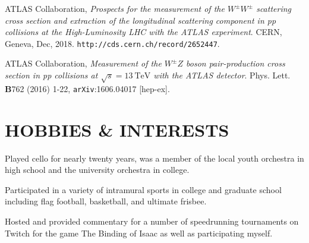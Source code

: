 \documentclass{res}
\begin{document}
\begin{resume}
    ATLAS Collaboration, {\it Prospects for the measurement of the $W^{\pm}W^{\pm}$ scattering cross section and extraction of the longitudinal scattering component in pp collisions at the High-Luminosity LHC with the ATLAS experiment}. CERN, Geneva, Dec, 2018. {\tt http://cds.cern.ch/record/2652447}. %

    ATLAS Collaboration, {\it Measurement of the $W^{\pm}Z$ boson pair-production cross section in pp collisions at $\sqrt{s}=13~\textrm{TeV}$ with the ATLAS detector}. Phys. Lett. {\bf B}762 (2016) 1-22, {\tt arXiv}:1606.04017 [hep-ex].

\section{HOBBIES \& INTERESTS}
   Played cello for nearly twenty years, was a member of the local youth orchestra in high school and the university orchestra in college.

   Participated in a variety of intramural sports in college and graduate school including flag football, basketball, and ultimate frisbee.

   Hosted and provided commentary for a number of speedrunning tournaments on Twitch for the game The Binding of Isaac as well as participating myself.
 
 
 
\end{resume}
\end{document}

